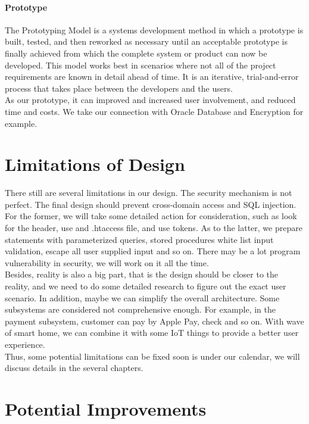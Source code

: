 \documentclass[12pt]{scrreprt}
\begin{document}
\subsubsection{Prototype}
The Prototyping Model is a systems development method in which a prototype is built, tested, and then reworked as necessary until an acceptable prototype is finally achieved from which the complete system or product can now be developed. This model works best in scenarios where not all of the project requirements are known in detail ahead of time. It is an iterative, trial-and-error process that takes place between the developers and the users.\\
As our prototype, it can improved and increased user involvement, and reduced time and costs. We take our connection with Oracle Database and Encryption for example.

\chapter{Limitations of Design}
There still are several limitations in our design. The security mechanism is not perfect. The final design should prevent cross-domain access and SQL injection. For the former, we will take some detailed action for consideration, such as look for the header, use and .htaccess file, and use tokens. As to the latter, we prepare statements with parameterized queries, stored procedures white list input validation, escape all user supplied input and so on. There may be a lot program vulnerability in security, we will work on it all the time.\\
Besides, reality is also a big part, that is the design should be closer to the reality, and we need to do some detailed research to figure out the exact user scenario. In addition, maybe we can simplify the overall architecture. Some subsystems are considered not comprehensive enough. For example, in the payment subsystem, customer can pay by Apple Pay, check and so on. With wave of smart home, we can combine it with some IoT things to provide a better user experience.\\
Thus, some potential limitations can be fixed soon is under our calendar, we will discuss details in the several chapters.

\chapter{Potential Improvements}
\end{document}

